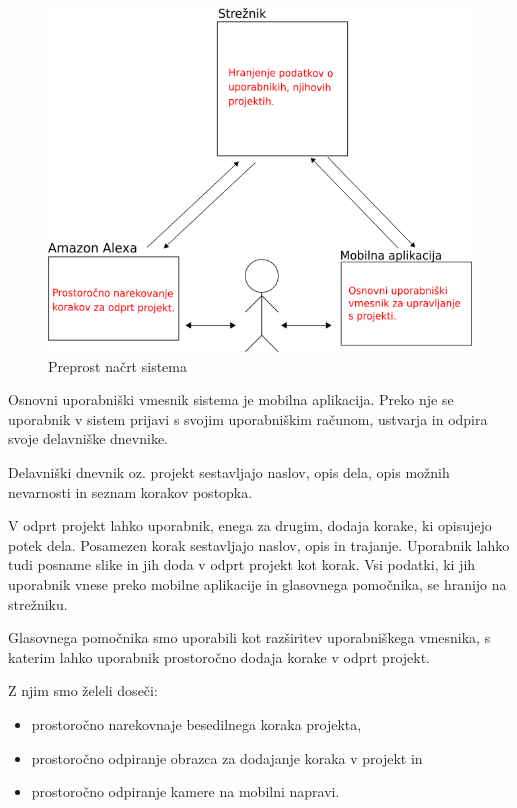 \documentclass[a4paper, 12pt]{book}
\begin{document}
\begin{figure}[H]
\begin{center}
\includegraphics[width=13cm]{plan_simple}
\end{center}
\caption{Preprost načrt sistema}
\label{plan_simple}
\end{figure}


Osnovni uporabniški vmesnik sistema je mobilna aplikacija.
Preko nje se uporabnik v sistem prijavi s svojim uporabniškim računom, ustvarja in odpira svoje delavniške dnevnike.

Delavniški dnevnik oz. projekt sestavljajo naslov, opis dela, opis možnih nevarnosti in seznam korakov postopka.

V odprt projekt lahko uporabnik, enega za drugim, dodaja korake, ki opisujejo potek dela.
Posamezen korak sestavljajo naslov, opis in trajanje.
Uporabnik lahko tudi posname slike in jih doda v odprt projekt kot korak.
Vsi podatki, ki jih uporabnik vnese preko mobilne aplikacije in glasovnega pomočnika, se hranijo na strežniku.

Glasovnega pomočnika smo uporabili kot razširitev uporabniškega vmesnika, s katerim lahko uporabnik prostoročno dodaja korake v odprt projekt.

\noindent Z njim smo želeli doseči:
\begin{itemize}
	\item prostoročno narekovnaje besedilnega koraka projekta,
	\item prostoročno odpiranje obrazca za dodajanje koraka v projekt in
	\item prostoročno odpiranje kamere na mobilni napravi.
\end{itemize}
\end{document}
